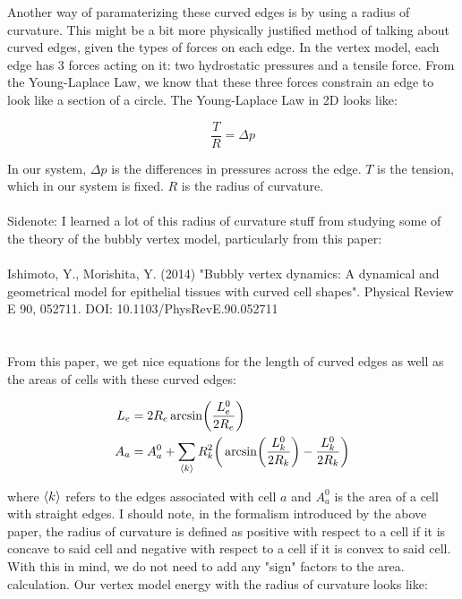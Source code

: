 \documentclass[12pt]{article}
\begin{document}
Another way of paramaterizing these curved edges is by using a radius of curvature. This might be a bit more physically justified method of talking about curved edges, given the types of forces on each edge. In the vertex model, each edge has 3 forces acting on it: two hydrostatic pressures and a tensile force. From the Young-Laplace Law, we know that these three forces constrain an edge to look like a section of a circle. The Young-Laplace Law in 2D looks like:
\begin{center}
\begin{equation}
\frac{T}{R} = \Delta p
\end{equation}
\end{center}
In our system, $\Delta p$ is the differences in pressures across the edge. $T$ is the tension, which in our system is fixed. $R$ is the radius of curvature. \\ \\
Sidenote: I learned a lot of this radius of curvature stuff from studying some of the theory of the bubbly vertex model, particularly from this paper: \\  \\
Ishimoto, Y., Morishita, Y. (2014) "Bubbly vertex dynamics: A dynamical and geometrical model for epithelial tissues with curved cell shapes". Physical Review E 90, 052711. DOI: 10.1103/PhysRevE.90.052711 \\ \\ \\
From this paper, we get nice equations for the length of curved edges as well as the areas of cells with these curved edges:
\begin{center}
\begin{equation}
\begin{split}
L_e &= 2 R_e \arcsin(\frac{L_e^0}{2 R_e})\\
A_a &= A_a^0 + \sum\limits_{\expval{k}} R_k^2\bigg(\arcsin(\frac{L_k^0}{2 R_k}) - \frac{L_k^0}{2 R_k}\bigg)\\
\end{split}
\end{equation}
\end{center}
where $\expval{k}$ refers to the edges associated with cell $a$ and $A_a^0$ is the area of a cell with straight edges. I should note, in the formalism introduced by the above paper, the radius of curvature is defined as positive with respect to a cell if it is concave to said cell and negative with respect to a cell if it is convex to said cell. With this in mind, we do not need to add any "sign" factors to the area. calculation. Our vertex model energy with the radius of curvature looks like:
\end{document}
